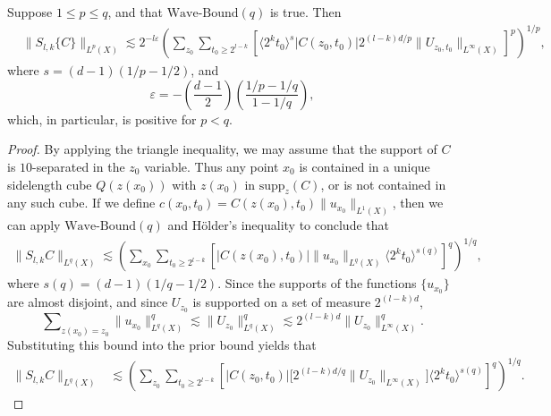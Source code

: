 \begin{lemma} \label{lemma:scaleupbound}
    Suppose $1 \leq p \leq q$, and that $\text{Wave-Bound}(q)$ is true. Then
    \begin{align*}
        &\| S_{l,k} \{ C \} \|_{L^p(X)}  \lesssim 2^{- l \varepsilon} \left( \sum\nolimits_{z_0} \sum\nolimits_{t_0 \geq 2^{l-k}} \left[ \langle 2^k t_0 \rangle^s |C(z_0,t_0)| 2^{(l-k)d/p} \| U_{z_0,t_0} \|_{L^\infty(X)} \right]^p \right)^{1/p},
    \end{align*}
    where $s = (d-1)(1/p - 1/2)$, and
    \[ \varepsilon = - \left( \frac{d-1}{2} \right) \left( \frac{1/p - 1/q}{1 - 1/q} \right), \]
    which, in particular, is positive for $p < q$.
\end{lemma}
\begin{proof}
    By applying the triangle inequality, we may assume that the support of $C$ is $10$-separated in the $z_0$ variable. Thus any point $x_0$ is contained in a unique sidelength cube $Q(z(x_0))$ with $z(x_0)$ in $\text{supp}_z(C)$, or is not contained in any such cube. If we define $c(x_0,t_0) = C(z(x_0),t_0) \| u_{x_0} \|_{L^1(X)}$, then we can apply $\text{Wave-Bound}(q)$ and H\"{o}lder's inequality to conclude that
    \begin{equation}
    \begin{split}
      \| S_{l,k} C \|_{L^q(X)} \lesssim \left( \sum\nolimits_{x_0} \sum\nolimits_{t_0 \geq 2^{l-k}} \left[ |C(z(x_0),t_0)| \| u_{x_0} \|_{L^q(X)} \langle 2^k t_0 \rangle^{s(q)} \right]^q \right)^{1/q},
    \end{split}
    \end{equation}
    where $s(q) = (d-1)(1/q - 1/2)$. Since the supports of the functions $\{ u_{x_0} \}$ are almost disjoint, and since $U_{z_0}$ is supported on a set of measure $2^{(l-k)d}$,
    \begin{equation}
        \sum\nolimits_{z(x_0) = z_0} \| u_{x_0} \|_{L^q(X)}^q \lesssim \| U_{z_0} \|_{L^q(X)}^q \lesssim 2^{(l-k)d} \| U_{z_0} \|_{L^\infty(X)}^q.
    \end{equation}
    Substituting this bound into the prior bound yields that
    \begin{equation}
    \begin{split}
        \| S_{l,k} C \|_{L^q(X)} &\lesssim \left( \sum\nolimits_{z_0} \sum\nolimits_{t_0 \geq 2^{l-k}} \left[ |C(z_0,t_0)| \big[ 2^{(l-k)d/q} \| U_{z_0} \|_{L^\infty(X)} \big] \langle 2^k t_0 \rangle^{s(q)} \right]^q \right)^{1/q}.

\end{split}
\end{equation}
\end{proof}
